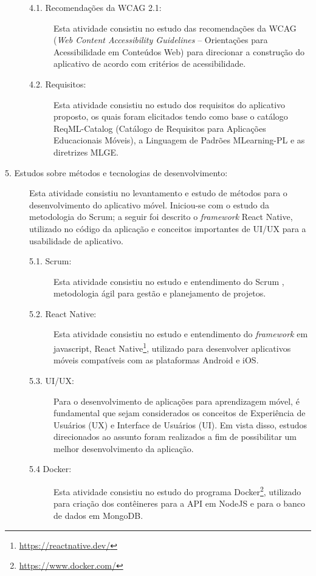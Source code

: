 \begin{description}
\begin{description}
    \item[4.1. Recomendações da WCAG 2.1:]
    Esta atividade consistiu no estudo das recomendações da WCAG (\textit{Web Content Accessibility Guidelines} -- Orientações para Acessibilidade em Conteúdos Web) para direcionar a construção do aplicativo de acordo com critérios de acessibilidade.
    
    \item[4.2. Requisitos:]
    Esta atividade consistiu no estudo dos requisitos do aplicativo proposto, os quais foram elicitados tendo como base o catálogo ReqML-Catalog (Catálogo de Requisitos para Aplicações Educacionais Móveis), a Linguagem de Padrões MLearning-PL e as diretrizes MLGE.
\end{description}


\item[5. Estudos sobre métodos e tecnologias de desenvolvimento:]
Esta atividade consistiu no levantamento e estudo de métodos para o desenvolvimento do aplicativo móvel. Iniciou-se com o estudo da metodologia do Scrum; a seguir foi descrito o \textit{framework} React Native, utilizado no código da aplicação e conceitos importantes de UI/UX para a usabilidade de aplicativo. 

\begin{description}
\item[5.1. Scrum:] Esta atividade consistiu no estudo e entendimento do Scrum \citep{scrumSite}, metodologia ágil para gestão e planejamento de projetos. %

\item[5.2. React Native:] Esta atividade consistiu no estudo e entendimento do \textit{framework} em javascript, React Native\footnote{\url{https://reactnative.dev/}}, utilizado para desenvolver aplicativos móveis compatíveis com as plataformas Android e iOS.

\item[5.3. UI/UX:] Para o desenvolvimento de aplicações para aprendizagem móvel, é fundamental que sejam considerados os conceitos de Experiência de Usuários (UX) e Interface de Usuários (UI). Em vista disso, estudos direcionados ao assunto foram realizados a fim de possibilitar um melhor desenvolvimento da aplicação.

\item[5.4 Docker:] Esta atividade consistiu no estudo do programa Docker\footnote{\url{https://www.docker.com/}}, utilizado para criação dos contêineres para a API em NodeJS e para o banco de dados em MongoDB.


\end{description}
\end{description}
